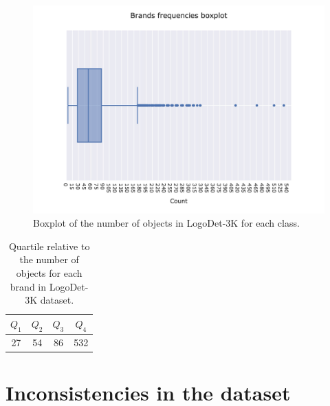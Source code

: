 \begin{figure}%
	\centering

    \begin{center}
        \includegraphics[width=\columnwidth]{images/box_plot.jpeg}
    \end{center}
	\caption{Boxplot of the number of objects in LogoDet-3K for each class.}%
	\label{fig:logodet-boxplot}%
\end{figure}


\begin{table}
    \centering
    \begin{tabular}{c  c  c  c } 
     \hline
     \textbf{$Q_1$} & \textbf{$Q_2$} & \textbf{$Q_3$} & \textbf{$Q_4$} \\
     \hline
     27 & 54 & 86 & 532 \\
    \end{tabular}
    \caption{Quartile relative to the number of objects for each brand in LogoDet-3K dataset.}
    \label{table:logodet3k-quartile}
\end{table}

\section{Inconsistencies in the dataset}


